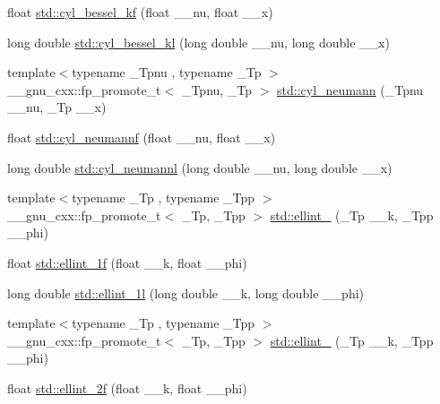 \begin{DoxyCompactItemize}
float \hyperlink{group__cxx17__math__spec__func_ga1f50047f9aab0ec8b1a1615fe9fbe32f}{std\+::cyl\+\_\+bessel\+\_\+kf} (float \+\_\+\+\_\+nu, float \+\_\+\+\_\+x)
\item 
long double \hyperlink{group__cxx17__math__spec__func_gac35194b926270d7857d651e06198c7d3}{std\+::cyl\+\_\+bessel\+\_\+kl} (long double \+\_\+\+\_\+nu, long double \+\_\+\+\_\+x)
\item 
{\footnotesize template$<$typename \+\_\+\+Tpnu , typename \+\_\+\+Tp $>$ }\\\+\_\+\+\_\+gnu\+\_\+cxx\+::fp\+\_\+promote\+\_\+t$<$ \+\_\+\+Tpnu, \+\_\+\+Tp $>$ \hyperlink{group__cxx17__math__spec__func_ga1e4bef23704469b0704cf15c5f04e29e}{std\+::cyl\+\_\+neumann} (\+\_\+\+Tpnu \+\_\+\+\_\+nu, \+\_\+\+Tp \+\_\+\+\_\+x)
\item 
float \hyperlink{group__cxx17__math__spec__func_ga604c13e8f2bb7cd3c7c91d8b19d6b13a}{std\+::cyl\+\_\+neumannf} (float \+\_\+\+\_\+nu, float \+\_\+\+\_\+x)
\item 
long double \hyperlink{group__cxx17__math__spec__func_gaf8986bae9a523c48d861d233835bda8f}{std\+::cyl\+\_\+neumannl} (long double \+\_\+\+\_\+nu, long double \+\_\+\+\_\+x)
\item 
{\footnotesize template$<$typename \+\_\+\+Tp , typename \+\_\+\+Tpp $>$ }\\\+\_\+\+\_\+gnu\+\_\+cxx\+::fp\+\_\+promote\+\_\+t$<$ \+\_\+\+Tp, \+\_\+\+Tpp $>$ \hyperlink{group__cxx17__math__spec__func_ga1550d6947bbbeee9865aabd398102a36}{std\+::ellint\+\_} (\+\_\+\+Tp \+\_\+\+\_\+k, \+\_\+\+Tpp \+\_\+\+\_\+phi)
\item 
float \hyperlink{group__cxx17__math__spec__func_ga308d23d70f4b5e848eb7a4173628ef3b}{std\+::ellint\+\_\+1f} (float \+\_\+\+\_\+k, float \+\_\+\+\_\+phi)
\item 
long double \hyperlink{group__cxx17__math__spec__func_ga795383fa51e02351000b410b478d824f}{std\+::ellint\+\_\+1l} (long double \+\_\+\+\_\+k, long double \+\_\+\+\_\+phi)
\item 
{\footnotesize template$<$typename \+\_\+\+Tp , typename \+\_\+\+Tpp $>$ }\\\+\_\+\+\_\+gnu\+\_\+cxx\+::fp\+\_\+promote\+\_\+t$<$ \+\_\+\+Tp, \+\_\+\+Tpp $>$ \hyperlink{group__cxx17__math__spec__func_gad64cb9babb7837d585912b1a94b2cb7d}{std\+::ellint\+\_} (\+\_\+\+Tp \+\_\+\+\_\+k, \+\_\+\+Tpp \+\_\+\+\_\+phi)
\item 
float \hyperlink{group__cxx17__math__spec__func_ga594a730163c6228c75b152462700062b}{std\+::ellint\+\_\+2f} (float \+\_\+\+\_\+k, float \+\_\+\+\_\+phi)

\end{DoxyCompactItemize}
